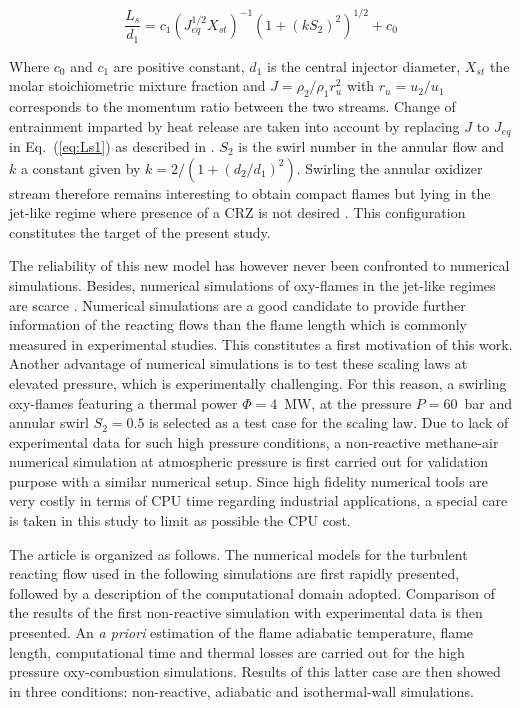 \documentclass[twocolumn,10pt]{asme2e}
\begin{document}
\begin{equation}
\label{eq:Ls1}
\frac{L_s}{d_1} = c_1 {(J_{eq}^{1/2}X_{st})}^{-1}(1+(kS_2)^2)^{1/2}+c_0 
\end{equation}

Where $c_0$ and $c_1$ are positive constant, $d_1$ is the central injector diameter, $X_{st}$ the molar stoichiometric mixture fraction and $J=\rho_2/\rho_1 r_u^2$ with $r_u=u_2/u_1$ corresponds to the momentum ratio between the two streams. Change of entrainment imparted by heat release are taken into account by replacing $J$ to $J_{eq}$ in Eq.~(\ref{eq:Ls1}) as described in \cite{tacina2000effects}. $S_2$ is the swirl number in the annular flow and $k$ a constant given by $k=2/(1+(d_2/d_1)^2)$. Swirling the annular oxidizer stream therefore remains interesting to obtain compact flames but lying in the jet-like regime where presence of a CRZ is not desired . This configuration constitutes the target of the present study.


The reliability of this new model has however never been confronted to numerical simulations. Besides, numerical simulations of oxy-flames in the jet-like regimes are scarce \cite{seepana2009flame,krieger2015numerical}. Numerical simulations are a good candidate to provide further information of the reacting flows than the flame length which is commonly measured in experimental studies. This constitutes a first motivation of this work. Another advantage of numerical simulations is to test these scaling laws at elevated pressure, which is experimentally challenging. For this reason, a swirling oxy-flames featuring a thermal power $\Phi = 4$~MW, at the pressure $P=60$~bar and annular swirl $S_2=0.5$ is selected as a test case for the scaling law. Due to lack of experimental data for such high pressure conditions, a non-reactive methane-air numerical simulation at atmospheric pressure is first carried out for validation purpose with a similar numerical setup. Since high fidelity numerical tools are very costly in terms of CPU time regarding industrial applications, a special care is taken in this study to limit as possible the CPU cost.

The article is organized as follows. The numerical models for the turbulent reacting flow used in the following simulations are first rapidly presented, followed by a description of the computational domain adopted. Comparison of the results of the first non-reactive simulation with experimental data is then presented. An \emph{a priori} estimation of the flame adiabatic temperature, flame length, computational time and thermal losses are carried out for the high pressure oxy-combustion simulations. Results of this latter case are then showed in three conditions: non-reactive, adiabatic and isothermal-wall simulations.
\end{document}
